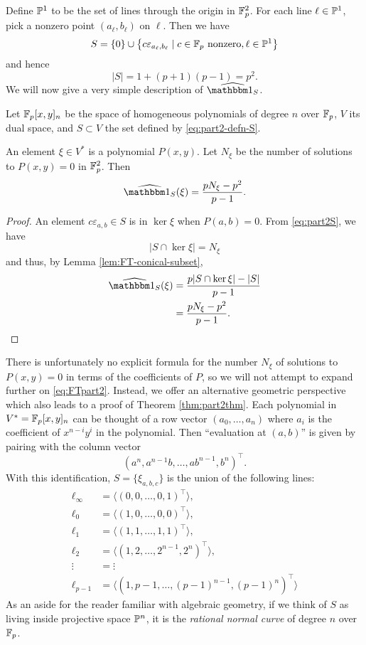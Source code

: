 Define $\P^1$ to be the set of lines through the origin in $\F_p^2$. For each line $\ell \in \P^1$, pick a nonzero point $(a_\ell,b_\ell)$ on $\ell$. Then we have
\begin{equation}\label{eq:part2S}
	S = \{0\} \cup \left\{c\varepsilon_{a_\ell,b_\ell} \mid c\in \F_p \text{ nonzero}, \ell \in \P^1 \right\}
\end{equation}
and hence
\[
	|S| = 1 + (p+1)(p-1) = p^2.
\]
We will now give a very simple description of $\widehat{\IND_S}$.
\begin{thm}\label{thm:part2thm}
	Let $\F_p[x,y]_n$ be the space of homogeneous polynomials of degree $n$ over $\F_p$, $V$ its dual space, and $S\subset V$ the set defined by \eqref{eq:part2-defn-S}.
	
	An element $\xi \in V^*$ is a polynomial $P(x,y)$. Let $N_\xi$ be the number of solutions to $P(x,y)=0$ in $\F_p^2$. Then
	\begin{equation}
		\widehat{\IND_S}(\xi) = \frac{pN_\xi - p^2}{p-1}.\label{eq:FTpart2}
	\end{equation}
\end{thm}
\begin{proof}
	An element $c\varepsilon_{a,b}\in S$ is in $\ker \xi$ when $P(a,b) = 0$. From \eqref{eq:part2S}, we have
	\begin{equation}\label{eq:part2-cross-section-soln-count}
		|S \cap \ker \xi| = N_\xi
	\end{equation}
	and thus, by Lemma \ref{lem:FT-conical-subset},
	\begin{align*}
		\widehat{\IND_S}(\xi) &= \frac{p|S\cap \ker \xi| - |S|}{p-1}\\
		&= \frac{pN_\xi - p^2}{p-1}.\qedhere
	\end{align*}
\end{proof}
There is unfortunately no explicit formula for the number $N_\xi$ of solutions to $P(x,y) = 0$ in terms of the coefficients of $P$, so we will not attempt to expand further on \eqref{eq:FTpart2}. Instead, we offer an alternative geometric perspective which also leads to a proof of Theorem \ref{thm:part2thm}. Each polynomial in $V^* = \F_p[x,y]_n$ can be thought of a row vector $(a_0,\ldots,a_n)$ where $a_i$ is the coefficient of $x^{n-i}y^i$ in the polynomial. Then ``evaluation at $(a,b)$'' is given by pairing with the column vector
\[
	(a^n,a^{n-1}b,\ldots,ab^{n-1},b^n)^\top.
\]
With this identification, $S = \{\xi_{a,b,c}\}$ is the union of the following lines:
\begin{align*}
	\ell_\infty &= \langle (0,0,\ldots,0,1)^\top \rangle,\\
	\ell_0 &= \langle (1,0,\ldots,0,0)^\top \rangle,\\
	\ell_1 &= \langle (1,1,\ldots,1,1)^\top \rangle,\\
	\ell_2 &= \langle (1,2,\ldots,2^{n-1},2^n)^\top \rangle,\\
	\vdots &= \vdots\\
	\ell_{p-1} &= \langle (1,p-1,\ldots,(p-1)^{n-1},(p-1)^n)^\top \rangle
\end{align*}
As an aside for the reader familiar with algebraic geometry, if we think of $S$ as living inside projective space $\P^{n}$, it is the \emph{rational normal curve} of degree $n$ over $\F_p$.

